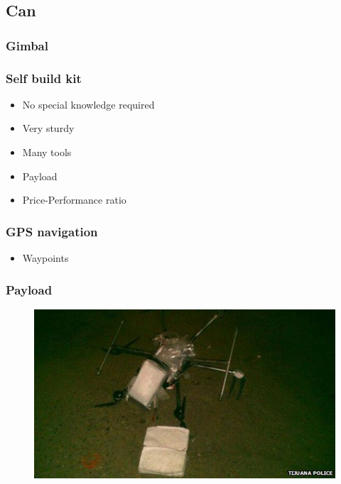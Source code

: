 \subsection{Can}

\begin{frame}

\frametitle{Gimbal}


\frametitle{Self build kit}

  \begin{itemize}
    \item No special knowledge required    
	\item Very sturdy
	\item Many tools
	\item Payload    
	\item Price-Performance ratio
  \end{itemize}

  
\end{frame}

\begin{frame}
\frametitle{GPS navigation}

  \begin{itemize}
    \item Waypoints
  \end{itemize}

    
\end{frame}

\begin{frame}
\frametitle{Payload}

  \begin{figure}
  \includegraphics[scale=0.6]{pic/03_our-copter/drug.jpg}
  \end{figure}
  
\end{frame}

